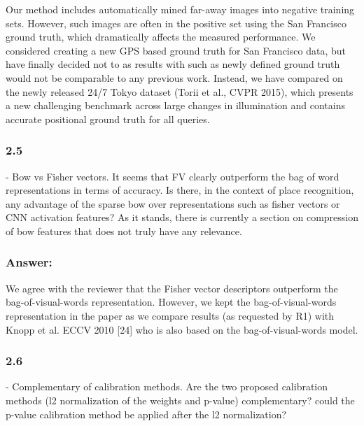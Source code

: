 \documentclass[a4paper,12pt]{article}
\begin{document}










Our method includes automatically mined far-away images into negative training sets. However, such images are often in the positive set using the San Francisco ground truth, which dramatically affects the measured performance. We considered creating a new GPS based ground truth for San Francisco data, but  have finally decided not to as results with such as newly defined ground truth would not be comparable to any previous work. Instead, we have compared on the newly released 24/7 Tokyo dataset (Torii et al., CVPR 2015), which presents a new challenging benchmark across large changes in illumination and contains accurate positional ground truth for all queries.   


\subsubsection*{2.5}
- Bow vs Fisher vectors. It seems that FV clearly outperform the bag of word representations in terms of accuracy. Is there, in the context of place recognition, any advantage of the sparse bow over representations such as fisher vectors or CNN activation features? As it stands, there is currently a section on compression of bow features that does not truly have any relevance.

\subsubsection*{Answer:} We agree with the reviewer that the Fisher vector descriptors outperform the bag-of-visual-words representation. However, we kept the bag-of-visual-words representation in the paper as we compare results (as requested by R1) with Knopp et al. ECCV 2010 [24] who is also based on the bag-of-visual-words model.


\subsubsection*{2.6}
- Complementary of calibration methods. Are the two proposed calibration methods (l2 normalization of the weights and p-value) complementary? could the p-value calibration method be applied after the l2 normalization?
\end{document}
